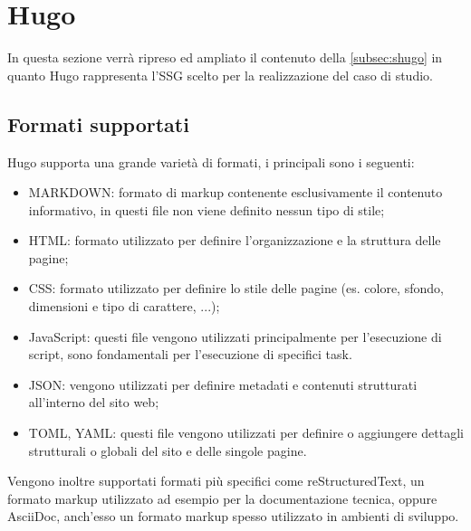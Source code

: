 \documentclass[target=bach,aauheader=]{thud}
\begin{document}
\section{Hugo}\label{sec:hugo}
In questa sezione verrà ripreso ed ampliato il contenuto della \cref{subsec:shugo} in quanto Hugo rappresenta l'SSG scelto per la realizzazione del caso di studio.

\subsection{Formati supportati}
Hugo supporta una grande varietà di formati, i principali sono i seguenti:

\begin{itemize}
    \item MARKDOWN: formato di markup contenente esclusivamente il contenuto informativo, in questi file non viene definito nessun tipo di stile;
    \item HTML: formato utilizzato per definire l'organizzazione e la struttura delle pagine;
    \item CSS: formato utilizzato per definire lo stile delle pagine (es. colore, sfondo, dimensioni e tipo di carattere, ...);
    \item JavaScript: questi file vengono utilizzati principalmente per l'esecuzione di script, sono fondamentali per l'esecuzione di specifici task.
    \item JSON: vengono utilizzati per definire metadati e contenuti strutturati all'interno del sito web; 
    \item TOML, YAML: questi file vengono utilizzati per definire o aggiungere dettagli strutturali o globali del sito e delle singole pagine. 
\end{itemize}

Vengono inoltre supportati formati più specifici come reStructuredText, un formato markup utilizzato ad esempio per la documentazione tecnica, oppure AsciiDoc, anch'esso un formato markup spesso utilizzato in ambienti di sviluppo.

\end{document}
